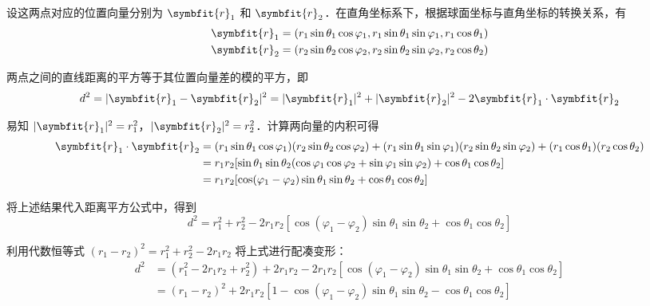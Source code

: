 \begin{myproof}
    设这两点对应的位置向量分别为 $\symbfit{r}_1$ 和 $\symbfit{r}_2$．在直角坐标系下，根据球面坐标与直角坐标的转换关系，有
    \begin{equation}
        \begin{aligned}
            \symbfit{r}_1 & = (r_1 \sin\theta_1 \cos\varphi_1, r_1 \sin\theta_1 \sin\varphi_1, r_1 \cos\theta_1) \\
            \symbfit{r}_2 & = (r_2 \sin\theta_2 \cos\varphi_2, r_2 \sin\theta_2 \sin\varphi_2, r_2 \cos\theta_2)
        \end{aligned}
    \end{equation}

    两点之间的直线距离的平方等于其位置向量差的模的平方，即
    \begin{equation}
        d^2 = |\symbfit{r}_1 - \symbfit{r}_2|^2 = |\symbfit{r}_1|^2 + |\symbfit{r}_2|^2 - 2 \symbfit{r}_1 \cdot \symbfit{r}_2
    \end{equation}

    易知 $|\symbfit{r}_1|^2 = r_1^2$，$|\symbfit{r}_2|^2 = r_2^2$．计算两向量的内积可得
    \begin{equation}
        \begin{aligned}
            \symbfit{r}_1 \cdot \symbfit{r}_2 & = (r_1 \sin\theta_1 \cos\varphi_1)(r_2 \sin\theta_2 \cos\varphi_2) + (r_1 \sin\theta_1 \sin\varphi_1)(r_2 \sin\theta_2 \sin\varphi_2) + (r_1 \cos\theta_1)(r_2 \cos\theta_2) \\
                                              & = r_1 r_2 [\sin\theta_1 \sin\theta_2 (\cos\varphi_1 \cos\varphi_2 + \sin\varphi_1 \sin\varphi_2) + \cos\theta_1 \cos\theta_2]                                                \\
                                              & = r_1 r_2 [\cos(\varphi_1 - \varphi_2) \sin\theta_1 \sin\theta_2 + \cos\theta_1 \cos\theta_2]
        \end{aligned}
    \end{equation}

    将上述结果代入距离平方公式中，得到
    \begin{equation}
        d^2 = r_1^2 + r_2^2 - 2r_1 r_2 [\cos(\varphi_1 - \varphi_2) \sin\theta_1 \sin\theta_2 + \cos\theta_1 \cos\theta_2]
    \end{equation}

    利用代数恒等式 $(r_1 - r_2)^2 = r_1^2 + r_2^2 - 2r_1 r_2$ 将上式进行配凑变形：
    \begin{equation}
        \begin{aligned}
            d^2 & = (r_1^2 - 2r_1 r_2 + r_2^2) + 2r_1 r_2 - 2r_1 r_2 [\cos(\varphi_1 - \varphi_2) \sin\theta_1 \sin\theta_2 + \cos\theta_1 \cos\theta_2] \\
                & = (r_1 - r_2)^2 + 2r_1 r_2 [1 - \cos(\varphi_1 - \varphi_2) \sin\theta_1 \sin\theta_2 - \cos\theta_1 \cos\theta_2]
        \end{aligned}
    \end{equation}


\end{myproof}
